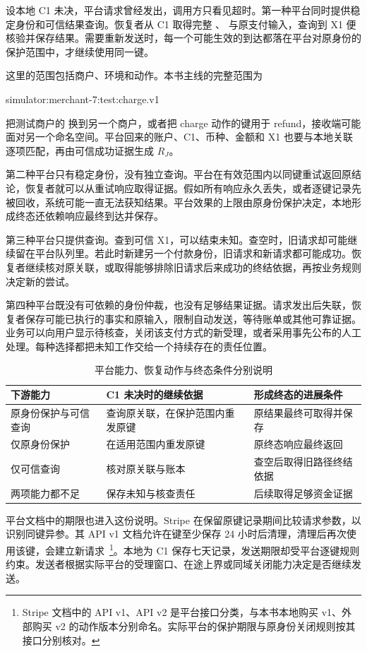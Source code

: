 设本地 C1 未决，平台请求曾经发出，调用方只看见超时。第一种平台同时提供稳定身份和可信结果查询。恢复者从 C1 取得完整 、 与原支付输入，查询到 X1 便核验并保存结果。需要重新发送时，每一个可能生效的到达都落在平台对原身份的保护范围中，才继续使用同一键。

这里的范围包括商户、环境和动作。本书主线的完整范围为
\begin{BookCode}
simulator:merchant-7:test:charge.v1
\end{BookCode}
把测试商户的  换到另一个商户，或者把 charge 动作的键用于 refund，接收端可能面对另一个命名空间。平台回来的账户、C1、币种、金额和 X1 也要与本地关联逐项匹配，再由可信成功证据生成 $R_J$。

第二种平台只有稳定身份，没有独立查询。平台在有效范围内以同键重试返回原结论，恢复者就可以从重试响应取得证据。假如所有响应永久丢失，或者逐键记录先被回收，系统可能一直无法获知结果。平台效果的上限由原身份保护决定，本地形成终态还依赖响应最终到达并保存。

第三种平台只提供查询。查到可信 X1，可以结束未知。查空时，旧请求却可能继续留在平台队列里。若此时新建另一个付款身份，旧请求和新请求都可能成功。恢复者继续核对原关联，或取得能够排除旧请求后来成功的终结依据，再按业务规则决定新的尝试。

第四种平台既没有可依赖的身份仲裁，也没有足够结果证据。请求发出后失联，恢复者保存可能已执行的事实和原输入，限制自动发送，等待账单或其他可靠证据。业务可以向用户显示待核查，关闭该支付方式的新受理，或者采用事先公布的人工处理。每种选择都把未知工作交给一个持续存在的责任位置。

\begin{table}[htbp]
\centering\small
\begin{tabularx}{\linewidth}{@{}p{.23\linewidth}XX@{}}
\toprule
下游能力 & C1 未决时的继续依据 & 形成终态的进展条件\\
\midrule
原身份保护与可信查询 & 查询原关联，在保护范围内重发原键 & 原结果最终可取得并保存\\
仅原身份保护 & 在适用范围内重发原键 & 原终态响应最终返回\\
仅可信查询 & 核对原关联与账本 & 查空后取得旧路径终结依据\\
两项能力都不足 & 保存未知与核查责任 & 后续取得足够资金证据\\
\bottomrule
\end{tabularx}
\caption{平台能力、恢复动作与终态条件分别说明}\label{tab:ch15-capabilities}
\end{table}

平台文档中的期限也进入这份说明。Stripe 在保留原键记录期间比较请求参数，以识别同键异参。其 API v1 文档允许在键至少保存 24 小时后清理，清理后再次使用该键，会建立新请求~\cite{stripe-v1-idempotency}\footnote{Stripe 文档中的 API v1、API v2 是平台接口分类，与本书本地购买 v1、外部购买 v2 的动作版本分别命名。实际平台的保护期限与原身份关闭规则按其接口分别核对。}。本地为 C1 保存七天记录，发送期限却受平台逐键规则约束。发送者根据实际平台的受理窗口、在途上界或同域关闭能力决定是否继续发送。

